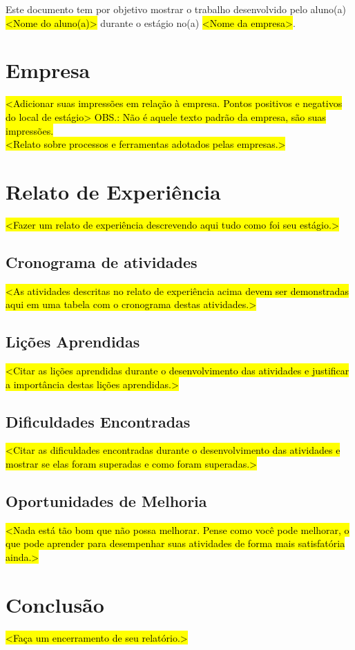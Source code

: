 \documentclass[a4paper]{article}
\begin{document}

Este documento tem por objetivo mostrar o trabalho desenvolvido pelo aluno(a) \hl{<Nome do aluno(a)>} durante o estágio no(a) \hl{<Nome da empresa>}.

\section*{Empresa}

\hl{<Adicionar suas impressões em relação à empresa. Pontos positivos e negativos do local de estágio> OBS.: Não é aquele texto padrão da empresa, são suas impressões. \\
<Relato sobre processos e ferramentas adotados pelas empresas.>
}

\section*{Relato de Experiência}

\hl{<Fazer um relato de experiência descrevendo aqui tudo como foi seu estágio.>}

\subsection*{Cronograma de atividades}

\hl{<As atividades descritas no relato de experiência acima devem ser demonstradas aqui em uma tabela com o cronograma destas atividades.>}

\subsection*{Lições Aprendidas}

\hl{<Citar as lições aprendidas durante o desenvolvimento das atividades e justificar a importância destas lições aprendidas.>}

\subsection*{Dificuldades Encontradas}

\hl{<Citar as dificuldades encontradas durante o desenvolvimento das atividades e mostrar se elas foram superadas e como foram superadas.>}

\subsection*{Oportunidades de Melhoria}

\hl{<Nada está tão bom que não possa melhorar. Pense como você pode melhorar, o que pode aprender para desempenhar suas atividades de forma mais satisfatória ainda.>}


\section*{Conclusão}

\hl{<Faça um encerramento de seu relatório.>}
\end{document}
